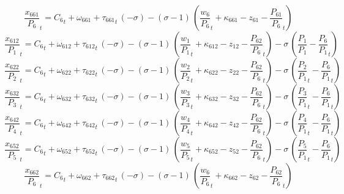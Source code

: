 \begin{dmath}
{{\frac{x_{661}}{P_{6}}}}_{t}={{C_{6}}}_{t}+{{\omega_{661}}}+{{\tau_{661}}}_{t}\, \left(-{{\sigma}}\right)-\left({{\sigma}}-1\right)\, \left({{\frac{w_{6}}{P_{6}}}}_{t}+{{\kappa_{661}}}-{{z_{61}}}-{{\frac{P_{61}}{P_{6}}}}_{t}\right)
\end{dmath}
\begin{dmath}
{{\frac{x_{612}}{P_{1}}}}_{t}={{C_{6}}}_{t}+{{\omega_{612}}}+{{\tau_{612}}}_{t}\, \left(-{{\sigma}}\right)-\left({{\sigma}}-1\right)\, \left({{\frac{w_{1}}{P_{1}}}}_{t}+{{\kappa_{612}}}-{{z_{12}}}-{{\frac{P_{62}}{P_{6}}}}_{t}\right)-{{\sigma}}\, \left({{\frac{P_{1}}{P_{1}}}}-{{\frac{P_{6}}{P_{1}}}}_{t}\right)
\end{dmath}
\begin{dmath}
{{\frac{x_{622}}{P_{2}}}}_{t}={{C_{6}}}_{t}+{{\omega_{622}}}+{{\tau_{622}}}_{t}\, \left(-{{\sigma}}\right)-\left({{\sigma}}-1\right)\, \left({{\frac{w_{2}}{P_{2}}}}_{t}+{{\kappa_{622}}}-{{z_{22}}}-{{\frac{P_{62}}{P_{6}}}}_{t}\right)-{{\sigma}}\, \left({{\frac{P_{2}}{P_{1}}}}_{t}-{{\frac{P_{6}}{P_{1}}}}_{t}\right)
\end{dmath}
\begin{dmath}
{{\frac{x_{632}}{P_{3}}}}_{t}={{C_{6}}}_{t}+{{\omega_{632}}}+{{\tau_{632}}}_{t}\, \left(-{{\sigma}}\right)-\left({{\sigma}}-1\right)\, \left({{\frac{w_{3}}{P_{3}}}}_{t}+{{\kappa_{632}}}-{{z_{32}}}-{{\frac{P_{62}}{P_{6}}}}_{t}\right)-{{\sigma}}\, \left({{\frac{P_{3}}{P_{1}}}}_{t}-{{\frac{P_{6}}{P_{1}}}}_{t}\right)
\end{dmath}
\begin{dmath}
{{\frac{x_{642}}{P_{4}}}}_{t}={{C_{6}}}_{t}+{{\omega_{642}}}+{{\tau_{642}}}_{t}\, \left(-{{\sigma}}\right)-\left({{\sigma}}-1\right)\, \left({{\frac{w_{4}}{P_{4}}}}_{t}+{{\kappa_{642}}}-{{z_{42}}}-{{\frac{P_{62}}{P_{6}}}}_{t}\right)-{{\sigma}}\, \left({{\frac{P_{4}}{P_{1}}}}_{t}-{{\frac{P_{6}}{P_{1}}}}_{t}\right)
\end{dmath}
\begin{dmath}
{{\frac{x_{652}}{P_{5}}}}_{t}={{C_{6}}}_{t}+{{\omega_{652}}}+{{\tau_{652}}}_{t}\, \left(-{{\sigma}}\right)-\left({{\sigma}}-1\right)\, \left({{\frac{w_{5}}{P_{5}}}}_{t}+{{\kappa_{652}}}-{{z_{52}}}-{{\frac{P_{62}}{P_{6}}}}_{t}\right)-{{\sigma}}\, \left({{\frac{P_{5}}{P_{1}}}}_{t}-{{\frac{P_{6}}{P_{1}}}}_{t}\right)
\end{dmath}
\begin{dmath}
{{\frac{x_{662}}{P_{6}}}}_{t}={{C_{6}}}_{t}+{{\omega_{662}}}+{{\tau_{662}}}_{t}\, \left(-{{\sigma}}\right)-\left({{\sigma}}-1\right)\, \left({{\frac{w_{6}}{P_{6}}}}_{t}+{{\kappa_{662}}}-{{z_{62}}}-{{\frac{P_{62}}{P_{6}}}}_{t}\right)
\end{dmath}
